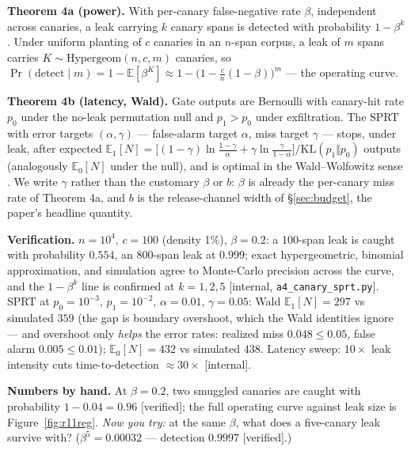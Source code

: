 \documentclass[11pt,a4paper]{article}
\begin{document}
\begin{thebox}
\textbf{Theorem 4a (power).} With per-canary false-negative rate $\beta$, independent across canaries, a leak carrying $k$ canary
spans is detected with probability $1-\beta^k$. Under uniform planting of $c$ canaries in an $n$-span corpus, a leak of $m$ spans
carries $K\sim\mathrm{Hypergeom}(n,c,m)$ canaries, so $\Pr(\text{detect}\mid m)=1-\mathbb{E}[\beta^K]\approx
1-\bigl(1-\tfrac{c}{n}(1-\beta)\bigr)^m$ --- the operating curve.

\textbf{Theorem 4b (latency, Wald).} Gate outputs are Bernoulli with canary-hit rate $p_0$ under the no-leak permutation null and
$p_1>p_0$ under exfiltration. The SPRT with error targets $(\alpha,\gamma)$ --- false-alarm target $\alpha$, miss target $\gamma$
--- stops, under leak, after expected
$\mathbb{E}_1[N]=\bigl[(1-\gamma)\ln\tfrac{1-\gamma}{\alpha}+\gamma\ln\tfrac{\gamma}{1-\alpha}\bigr]/\mathrm{KL}(p_1\Vert p_0)$ outputs (analogously
$\mathbb{E}_0[N]$ under the null), and is optimal in the Wald--Wolfowitz sense \cite{wald,wald-wolfowitz}. We write $\gamma$
rather than the customary $\beta$ or $b$: $\beta$ is already the per-canary miss rate of Theorem 4a, and $b$ is the release-channel
width of \S\ref{sec:budget}, the paper's headline quantity.

\textbf{Verification.} $n{=}10^4$, $c{=}100$ (density 1\%), $\beta{=}0.2$: a 100-span leak is caught with probability $0.554$, an
800-span leak at $0.999$; exact hypergeometric, binomial approximation, and simulation agree to Monte-Carlo precision across the
curve, and the $1-\beta^k$ line is confirmed at $k{=}1,2,5$ [internal, \texttt{a4\_canary\_sprt.py}]. SPRT at $p_0{=}10^{-3}$,
$p_1{=}10^{-2}$, $\alpha{=}0.01$, $\gamma{=}0.05$: Wald $\mathbb{E}_1[N]=297$ vs simulated $359$ (the gap is boundary overshoot, which
the Wald identities ignore --- and overshoot only \emph{helps} the error rates: realized miss $0.048\le 0.05$, false alarm
$0.005\le 0.01$); $\mathbb{E}_0[N]=432$ vs simulated $438$. Latency sweep: $10\times$ leak intensity cuts time-to-detection
$\approx 30\times$
[internal].
\end{thebox}

\textbf{Numbers by hand.} At $\beta=0.2$, two smuggled canaries are caught with probability $1-0.04=0.96$ [verified]; the full
operating curve against leak size is Figure~\ref{fig:r11reg}.
\emph{Now you try:} at the same $\beta$, what does a five-canary leak survive with? ($\beta^5=0.00032$ --- detection $0.9997$ [verified].)


\end{document}
